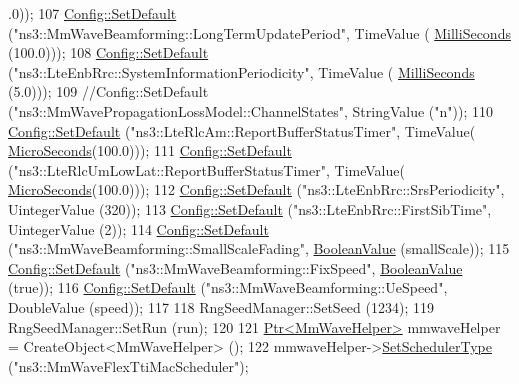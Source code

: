 \begin{DoxyCode}
      .0));
107         \hyperlink{group__config_ga2e7882df849d8ba4aaad31c934c40c06}{Config::SetDefault} (\textcolor{stringliteral}{"ns3::MmWaveBeamforming::LongTermUpdatePeriod"}, TimeValue (
      \hyperlink{group__timecivil_gaf26127cf4571146b83a92ee18679c7a9}{MilliSeconds} (100.0)));
108         \hyperlink{group__config_ga2e7882df849d8ba4aaad31c934c40c06}{Config::SetDefault} (\textcolor{stringliteral}{"ns3::LteEnbRrc::SystemInformationPeriodicity"}, TimeValue (
      \hyperlink{group__timecivil_gaf26127cf4571146b83a92ee18679c7a9}{MilliSeconds} (5.0)));
109         \textcolor{comment}{//Config::SetDefault ("ns3::MmWavePropagationLossModel::ChannelStates", StringValue ("n"));}
110         \hyperlink{group__config_ga2e7882df849d8ba4aaad31c934c40c06}{Config::SetDefault} (\textcolor{stringliteral}{"ns3::LteRlcAm::ReportBufferStatusTimer"}, TimeValue(
      \hyperlink{group__timecivil_ga17465a639c8d1464e76538afdd78a9f0}{MicroSeconds}(100.0)));
111         \hyperlink{group__config_ga2e7882df849d8ba4aaad31c934c40c06}{Config::SetDefault} (\textcolor{stringliteral}{"ns3::LteRlcUmLowLat::ReportBufferStatusTimer"}, TimeValue(
      \hyperlink{group__timecivil_ga17465a639c8d1464e76538afdd78a9f0}{MicroSeconds}(100.0)));
112         \hyperlink{group__config_ga2e7882df849d8ba4aaad31c934c40c06}{Config::SetDefault} (\textcolor{stringliteral}{"ns3::LteEnbRrc::SrsPeriodicity"}, UintegerValue (320));
113         \hyperlink{group__config_ga2e7882df849d8ba4aaad31c934c40c06}{Config::SetDefault} (\textcolor{stringliteral}{"ns3::LteEnbRrc::FirstSibTime"}, UintegerValue (2));
114         \hyperlink{group__config_ga2e7882df849d8ba4aaad31c934c40c06}{Config::SetDefault} (\textcolor{stringliteral}{"ns3::MmWaveBeamforming::SmallScaleFading"}, 
      \hyperlink{classns3_1_1BooleanValue}{BooleanValue} (smallScale));
115         \hyperlink{group__config_ga2e7882df849d8ba4aaad31c934c40c06}{Config::SetDefault} (\textcolor{stringliteral}{"ns3::MmWaveBeamforming::FixSpeed"}, 
      \hyperlink{classns3_1_1BooleanValue}{BooleanValue} (\textcolor{keyword}{true}));
116         \hyperlink{group__config_ga2e7882df849d8ba4aaad31c934c40c06}{Config::SetDefault} (\textcolor{stringliteral}{"ns3::MmWaveBeamforming::UeSpeed"}, DoubleValue (speed));
117 
118         RngSeedManager::SetSeed (1234);
119         RngSeedManager::SetRun (run);
120 
121   \hyperlink{classns3_1_1Ptr}{Ptr<MmWaveHelper>} mmwaveHelper = CreateObject<MmWaveHelper> ();
122         mmwaveHelper->\hyperlink{classns3_1_1MmWaveHelper_ae38f5e96d749ab63dda7746f43dfbe84}{SetSchedulerType} (\textcolor{stringliteral}{"ns3::MmWaveFlexTtiMacScheduler"});

\end{DoxyCode}
